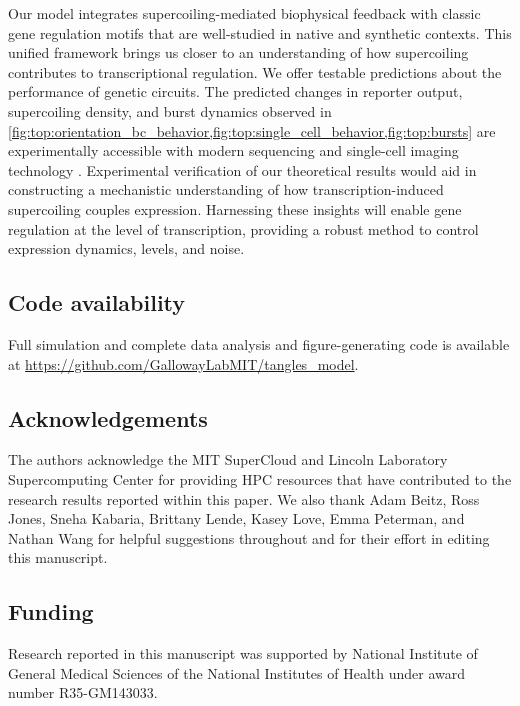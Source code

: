 \documentclass[11pt]{article}
\begin{document}


Our model integrates supercoiling-mediated biophysical feedback with classic gene regulation motifs that are well-studied in native and synthetic contexts. This unified framework brings us closer to an understanding of how supercoiling contributes to transcriptional regulation. We offer testable predictions about the performance of genetic circuits. The predicted changes in reporter output, supercoiling density, and burst dynamics observed in \cref{fig:top:orientation_bc_behavior,fig:top:single_cell_behavior,fig:top:bursts} are experimentally accessible with modern sequencing and single-cell imaging technology \parencite{guoHighresolutionGenomewideMapping2021,mellorInterleavedGenome2016,patelDNASupercoilingRestricts2022}. Experimental verification of our theoretical results would aid in constructing a mechanistic understanding of how transcription-induced supercoiling couples expression. Harnessing these insights will enable gene regulation at the level of transcription, providing a robust method to control expression dynamics, levels, and noise.

\subsection{Code availability}
Full simulation and complete data analysis and figure-generating code is available at \url{https://github.com/GallowayLabMIT/tangles_model}.

\subsection{Acknowledgements}
The authors acknowledge the MIT SuperCloud and Lincoln Laboratory Supercomputing Center \parencite{reutherInteractiveSupercomputing402018} for providing HPC resources that have contributed to the research results reported within this paper. We also thank Adam Beitz,  Ross Jones, Sneha Kabaria, Brittany Lende, Kasey Love, Emma Peterman, and Nathan Wang for helpful suggestions throughout and for their effort in editing this manuscript.

\subsection{Funding}
Research reported in this manuscript was supported by National Institute of General Medical Sciences of the National Institutes of Health under award number R35-GM143033.
\end{document}
